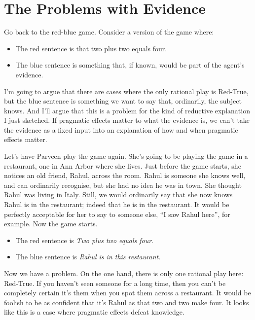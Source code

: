 \section{The Problems with Evidence}
\label{theproblemswithevidence}

Go back to the red-blue game. Consider a version of the game where:

\begin{itemize}
\item The red sentence is that two plus two equals four.

\item The blue sentence is something that, if known, would be part of the agent's evidence.

\end{itemize}
I'm going to argue that there are cases where the only rational play is Red-True, but the blue sentence is something we want to say that, ordinarily, the subject knows. And I'll argue that this is a problem for the kind of reductive explanation I just sketched. If pragmatic effects matter to what the evidence is, we can't take the evidence as a fixed input into an explanation of how and when pragmatic effects matter. 

Let's have Parveen play the game again. She's going to be playing the game in a restaurant, one in Ann Arbor where she lives. Just before the game starts, she notices an old friend, Rahul, across the room. Rahul is someone she knows well, and can ordinarily recognise, but she had no idea he was in town. She thought Rahul was living in Italy. Still, we would ordinarily say that she now knows Rahul is in the restaurant; indeed that he is in the restaurant. It would be perfectly acceptable for her to say to someone else, ``I saw Rahul here'', for example. Now the game starts.

\begin{itemize}
\item The red sentence is \emph{Two plus two equals four}.

\item The blue sentence is \emph{Rahul is in this restaurant}.

\end{itemize}
Now we have a problem. On the one hand, there is only one rational play here: Red-True. If you haven't seen someone for a long time, then you can't be completely certain it's them when you spot them across a restaurant. It would be foolish to be as confident that it's Rahul as that two and two make four. It looks like this is a case where pragmatic effects defeat knowledge.

